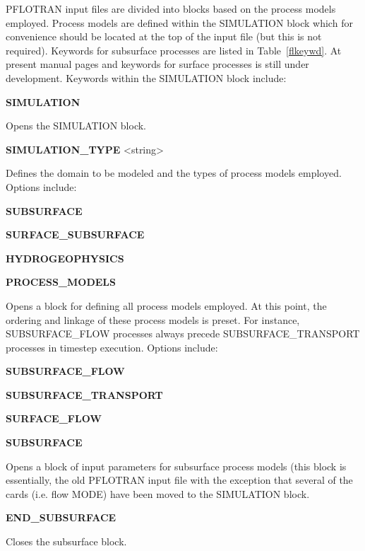 PFLOTRAN input files are divided into blocks based on the process models employed. Process models are defined within the SIMULATION block which for convenience should be located at the top of the input file (but this is not required). 
Keywords for subsurface processes are listed in Table~\ref{flkeywd}. At present  manual pages and keywords for surface processes is still under development.
Keywords within the SIMULATION block include:
\begin{description}
\item {\bf SIMULATION}
\begin{description}
    \item Opens the SIMULATION block.
    \end{description}

\item {\bf SIMULATION\_TYPE}  <string>
\begin{description}
    \item Defines the domain to be modeled and the types of process 
    models employed. Options include:
    
    \item {\bf SUBSURFACE}

    \item {\bf SURFACE\_SUBSURFACE}

    \item {\bf HYDROGEOPHYSICS}
\end{description}

\item {\bf PROCESS\_MODELS}
\begin{description}
\item Opens a block for defining all process models employed. 
    At this point, the ordering and linkage of these process 
    models is preset. For instance, SUBSURFACE\_FLOW processes 
    always precede SUBSURFACE\_TRANSPORT processes in timestep 
    execution. Options include:
    
\item {\bf SUBSURFACE\_FLOW}

\item {\bf SUBSURFACE\_TRANSPORT}

\item {\bf SURFACE\_FLOW}
\end{description}

\item {\bf SUBSURFACE}
\begin{description}
   \item Opens a block of input parameters for subsurface process models 
    (this block is essentially, the old PFLOTRAN input file with the 
    exception that several of the cards (i.e. flow MODE) have been 
    moved to the SIMULATION block.
\end{description}
\item {\bf END\_SUBSURFACE}
\begin{description}
    \item Closes the subsurface block.
    \end{description}
\end{description}


